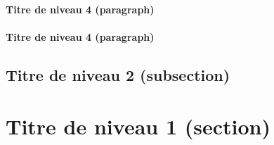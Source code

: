 \paragraph{Titre de niveau 4 (paragraph)} \blindtext

\paragraph{Titre de niveau 4 (paragraph)} \blindtext

	\subsection{Titre de niveau 2 (subsection)}
\blindtext


\section{Titre de niveau 1 (section)}
\blindtext


\clearpage
\thispagestyle{empty}